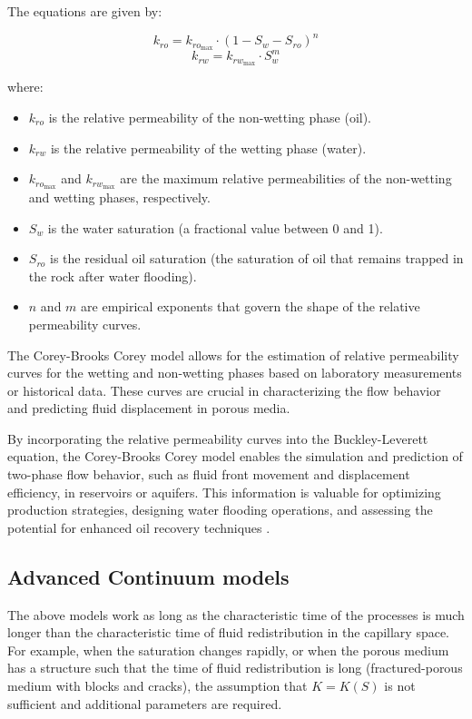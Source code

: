 		The equations are given by:

		\[ k_{ro} = k_{ro_{\text{max}}} \cdot (1 - S_w - S_{ro})^n \]
		\[ k_{rw} = k_{rw_{\text{max}}} \cdot S_w^m \]
		 
		where:
		\begin{itemize}
			\item  \( k_{ro} \) is the relative permeability of the non-wetting phase (oil).
			
			\item\( k_{rw} \) is the relative permeability of the wetting phase (water).
			
			\item \( k_{ro_{\text{max}}} \) and \( k_{rw_{\text{max}}} \) are the maximum relative permeabilities of the non-wetting and wetting phases, respectively.
			
			\item \( S_w \) is the water saturation (a fractional value between 0 and 1).
			
			\item \( S_{ro} \) is the residual oil saturation (the saturation of oil that remains trapped in the rock after water flooding).
			
			\item \( n \) and \( m \) are empirical exponents that govern the shape of the relative permeability curves.
			
		\end{itemize}

		The Corey-Brooks Corey model allows for the estimation of relative permeability curves for the wetting and non-wetting phases based on laboratory measurements or historical data. These curves are crucial in characterizing the flow behavior and predicting fluid displacement in porous media.
		
		By incorporating the relative permeability curves into the Buckley-Leverett equation, the Corey-Brooks Corey model enables the simulation and prediction of two-phase flow behavior, such as fluid front movement and displacement efficiency, in reservoirs or aquifers. This information is valuable for optimizing production strategies, designing water flooding operations, and assessing the potential for enhanced oil recovery techniques \cite{tryggvason2001front}.
	
		
\subsection{Advanced Continuum models}
	The above models work as long as the characteristic time of the processes is much longer than the characteristic time of fluid redistribution in the capillary space.
	For example, when the saturation changes rapidly, or when the porous medium has a structure such that the time of fluid redistribution is long (fractured-porous medium with blocks and cracks), the assumption that $K = K(S)$ is not sufficient and additional parameters are required.

